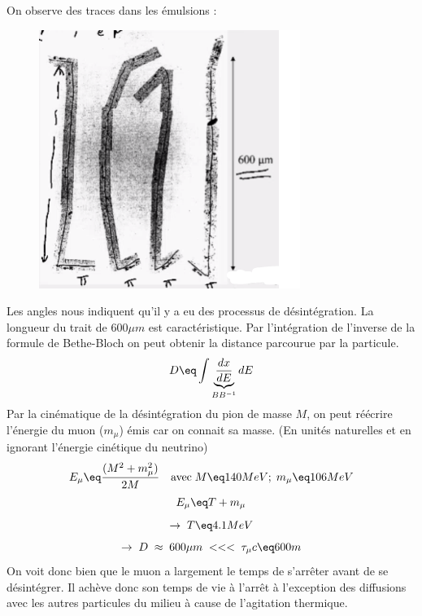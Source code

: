 On observe des traces dans les émulsions :
\begin{figure}[H]
    \centering
    \includegraphics{Images4/traces.png}
\end{figure}
Les angles nous indiquent qu'il y a eu des processus de désintégration. La longueur du trait de $600\mu m$ est caractéristique. Par l'intégration de l'inverse de la formule de Bethe-Bloch on peut obtenir la distance parcourue par la particule.
\begin{equation*}
    D\eq \int \underbrace{\dfrac{dx}{dE}}_{BB^{-1}} dE
\end{equation*}
Par la cinématique de la désintégration du pion de masse $M$, on peut réécrire l'énergie du muon ($m_\mu$) émis car on connait sa masse. (En unités naturelles et en ignorant l'énergie cinétique du neutrino)
\begin{equation*}
    E_\mu \eq \frac{(M^2 + m_\mu^2)}{2M}\quad \text{avec} \; M \eq 140MeV; \; m_\mu \eq 106MeV
\end{equation*}
\begin{equation*}
    E_\mu \eq T + m_\mu
\end{equation*}
\begin{equation*}
    \rightarrow\;T\eq 4.1MeV
\end{equation*}
\begin{equation*}
    \rightarrow \; D \; \approx \; 600\mu m \; <<< \; \tau_\mu c \eq 600m
\end{equation*}
On voit donc bien que le muon a largement le temps de s'arrêter avant de se désintégrer. Il achève donc son temps de vie à l'arrêt à l'exception des diffusions avec les autres particules du milieu à cause de l'agitation thermique.\\

